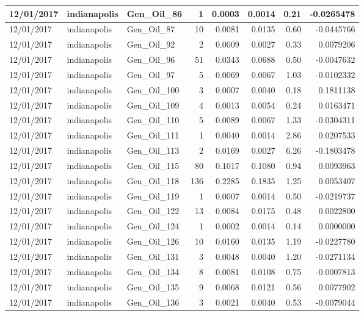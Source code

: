 \documentclass[
  letterpaper,
  DIV=11,
  numbers=noendperiod]{scrartcl}
\begin{document}
\begin{tabular}{l|l|l|r|r|r|r|r}
\hline
12/01/2017 & indianapolis & Gen\_Oil\_86 & 1 & 0.0003 & 0.0014 & 0.21 & -0.0265478\\
\hline
12/01/2017 & indianapolis & Gen\_Oil\_87 & 10 & 0.0081 & 0.0135 & 0.60 & -0.0445766\\
\hline
12/01/2017 & indianapolis & Gen\_Oil\_92 & 2 & 0.0009 & 0.0027 & 0.33 & 0.0079206\\
\hline
12/01/2017 & indianapolis & Gen\_Oil\_96 & 51 & 0.0343 & 0.0688 & 0.50 & -0.0047632\\
\hline
12/01/2017 & indianapolis & Gen\_Oil\_97 & 5 & 0.0069 & 0.0067 & 1.03 & -0.0102332\\
\hline
12/01/2017 & indianapolis & Gen\_Oil\_100 & 3 & 0.0007 & 0.0040 & 0.18 & 0.1811138\\
\hline
12/01/2017 & indianapolis & Gen\_Oil\_109 & 4 & 0.0013 & 0.0054 & 0.24 & 0.0163471\\
\hline
12/01/2017 & indianapolis & Gen\_Oil\_110 & 5 & 0.0089 & 0.0067 & 1.33 & -0.0304311\\
\hline
12/01/2017 & indianapolis & Gen\_Oil\_111 & 1 & 0.0040 & 0.0014 & 2.86 & 0.0207533\\
\hline
12/01/2017 & indianapolis & Gen\_Oil\_113 & 2 & 0.0169 & 0.0027 & 6.26 & -0.1803478\\
\hline
12/01/2017 & indianapolis & Gen\_Oil\_115 & 80 & 0.1017 & 0.1080 & 0.94 & 0.0093963\\
\hline
12/01/2017 & indianapolis & Gen\_Oil\_118 & 136 & 0.2285 & 0.1835 & 1.25 & 0.0053407\\
\hline
12/01/2017 & indianapolis & Gen\_Oil\_119 & 1 & 0.0007 & 0.0014 & 0.50 & -0.0219737\\
\hline
12/01/2017 & indianapolis & Gen\_Oil\_122 & 13 & 0.0084 & 0.0175 & 0.48 & 0.0022800\\
\hline
12/01/2017 & indianapolis & Gen\_Oil\_124 & 1 & 0.0002 & 0.0014 & 0.14 & 0.0000000\\
\hline
12/01/2017 & indianapolis & Gen\_Oil\_126 & 10 & 0.0160 & 0.0135 & 1.19 & -0.0227780\\
\hline
12/01/2017 & indianapolis & Gen\_Oil\_131 & 3 & 0.0048 & 0.0040 & 1.20 & -0.0271134\\
\hline
12/01/2017 & indianapolis & Gen\_Oil\_134 & 8 & 0.0081 & 0.0108 & 0.75 & -0.0007813\\
\hline
12/01/2017 & indianapolis & Gen\_Oil\_135 & 9 & 0.0068 & 0.0121 & 0.56 & 0.0077902\\
\hline
12/01/2017 & indianapolis & Gen\_Oil\_136 & 3 & 0.0021 & 0.0040 & 0.53 & -0.0079044\\

\end{tabular}
\end{document}
